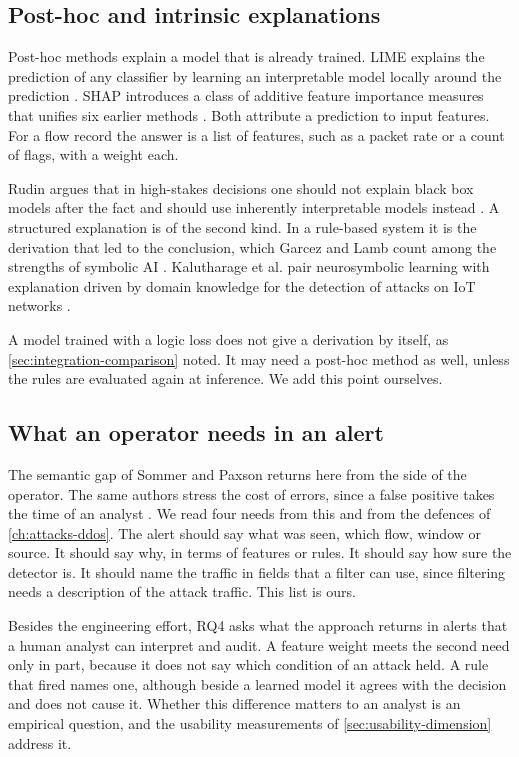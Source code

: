 \subsection{Post-hoc and intrinsic explanations}
\label{sec:posthoc-vs-intrinsic}

Post-hoc methods explain a model that is already trained. LIME explains the
prediction of any classifier by learning an interpretable model locally
around the prediction \citep{ribeiro2016lime}. SHAP introduces a class of
additive feature importance measures that unifies six earlier methods
\citep{lundberg2017shap}. Both attribute a prediction to input features. For
a flow record the answer is a list of features, such as a packet rate or a
count of flags, with a weight each.

Rudin argues that in high-stakes decisions one should not explain black box
models after the fact and should use inherently interpretable models instead
\citep{rudin2019stop}. A structured explanation is of the second kind. In a
rule-based system it is the derivation that led to the conclusion, which
Garcez and Lamb count among the strengths of symbolic AI
\citep{garcez2020thirdwave}. Kalutharage et al. pair neurosymbolic learning
with explanation driven by domain knowledge for the detection of attacks on
IoT networks \citep{kalutharage2025neurosymbolic}.

A model trained with a logic loss does not give a derivation by itself, as
\cref{sec:integration-comparison} noted. It may need a post-hoc method as
well, unless the rules are evaluated again at inference. We add this point
ourselves.

\subsection{What an operator needs in an alert}
\label{sec:operator-needs}

The semantic gap of Sommer and Paxson returns here from the side of the
operator. The same authors stress the cost of errors, since a false positive
takes the time of an analyst \citep{sommer2010outside}. We read four
needs from this and from the defences of \cref{ch:attacks-ddos}. The alert
should say what was seen, which flow, window or source. It should say why, in
terms of features or rules. It should say how sure the detector is. It should
name the traffic in fields that a filter can use, since filtering needs a
description of the attack traffic. This list is ours.

Besides the engineering effort, RQ4 asks what the approach returns in alerts
that a human analyst can interpret and audit. A feature weight meets the second need only in part,
because it does not say which condition of an attack held. A rule that fired
names one, although beside a learned model it agrees with the decision and does
not cause it. Whether this difference matters to an analyst is an empirical
question, and the usability measurements of \cref{sec:usability-dimension}
address it.

